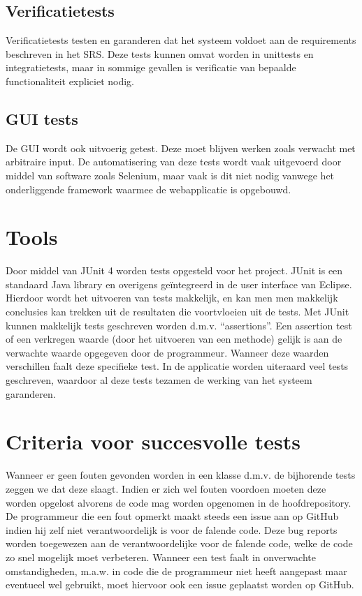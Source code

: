 \subsection{Verificatietests}
Verificatietests testen en garanderen dat het systeem voldoet aan de requirements beschreven in het SRS\cite{srs}. 
Deze tests kunnen omvat worden in unittests en integratietests, maar in sommige gevallen is verificatie van bepaalde functionaliteit expliciet nodig.

\subsection{GUI tests}
De GUI wordt ook uitvoerig getest.
Deze moet blijven werken zoals verwacht met arbitraire input. De automatisering van deze tests wordt vaak uitgevoerd door middel van software zoals Selenium, maar vaak is dit niet nodig vanwege het onderliggende framework waarmee de webapplicatie is opgebouwd.

\section{Tools}
Door middel van JUnit 4\cite{junit} worden tests opgesteld voor het project. 
JUnit is een standaard Java library en overigens geïntegreerd in de user interface van Eclipse.
Hierdoor wordt het uitvoeren van tests makkelijk, en kan men men makkelijk conclusies kan trekken uit de resultaten die voortvloeien uit de tests.
Met JUnit kunnen makkelijk tests geschreven worden d.m.v. ``assertions''. 
Een assertion test of een verkregen waarde (door het uitvoeren van een methode) gelijk is aan de verwachte waarde opgegeven door de programmeur. 
Wanneer deze waarden verschillen faalt deze specifieke test.
In de applicatie worden uiteraard veel tests geschreven, waardoor al deze tests tezamen de werking van het systeem garanderen. 

\section{Criteria voor succesvolle tests}
Wanneer er geen fouten gevonden worden in een klasse d.m.v. de bijhorende tests zeggen we dat deze slaagt. 
Indien er zich wel fouten voordoen moeten deze worden opgelost alvorens de code mag worden opgenomen in de hoofdrepository.
De programmeur die een fout opmerkt maakt steeds een issue aan op GitHub indien hij zelf niet verantwoordelijk is voor de falende code.
Deze bug reports worden toegewezen aan de verantwoordelijke voor de falende code, welke de code zo snel mogelijk moet verbeteren. 
Wanneer een test faalt in onverwachte omstandigheden, m.a.w. in code die de programmeur niet heeft aangepast maar eventueel wel gebruikt, moet hiervoor ook een issue geplaatst worden op GitHub.


